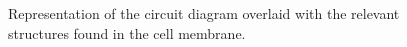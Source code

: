 \documentclass[Orator.tex]{subfiles}
\begin{document}
\begin{figure}[h]
    \caption{Representation of the circuit diagram overlaid with the relevant structures found in the cell membrane.}
    \label{fig:MembraneCircut}
\end{figure}
\end{document}
